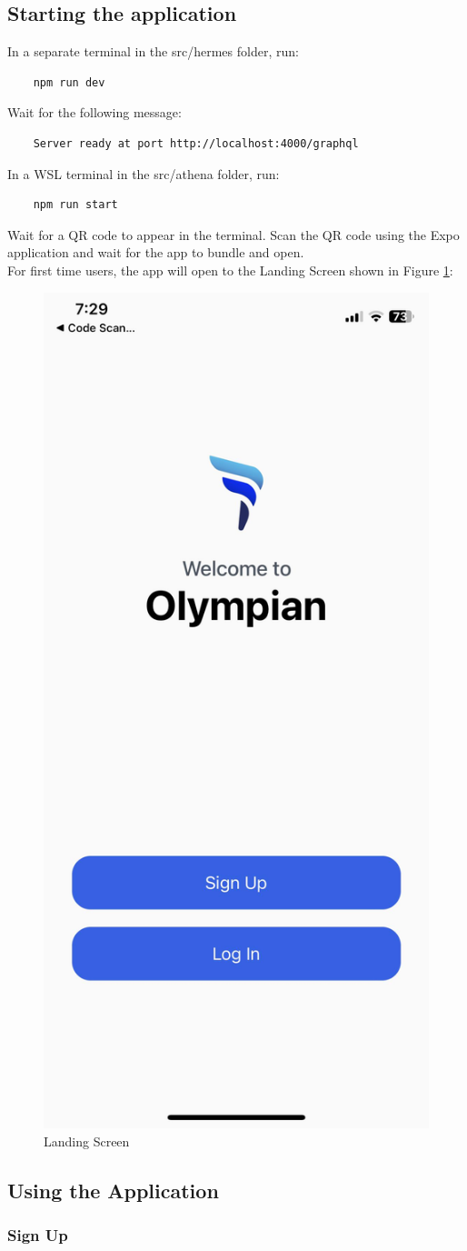 \documentclass{article}
\begin{document}
\subsection{Starting the application}

In a separate terminal in the src/hermes folder, run:
    \begin{verbatim}
    npm run dev
    \end{verbatim}

Wait for the following message:
    \begin{verbatim}
    Server ready at port http://localhost:4000/graphql
    \end{verbatim}

In a WSL terminal in the src/athena folder, run:
    \begin{verbatim}
    npm run start
    \end{verbatim}

Wait for a QR code to appear in the terminal. Scan the QR code using the Expo application and wait for the app to bundle and open.\\
For first time users, the app will open to the Landing Screen shown in Figure \ref{FigLanding}:
\begin{figure}[H]
    \centering
    \includegraphics[height=0.6\textwidth]{imgs/Landing.jpg}
    \caption{Landing Screen}
    \label{FigLanding}
    \end{figure}


\subsection{Using the Application}

\subsubsection{Sign Up}
\end{document}
